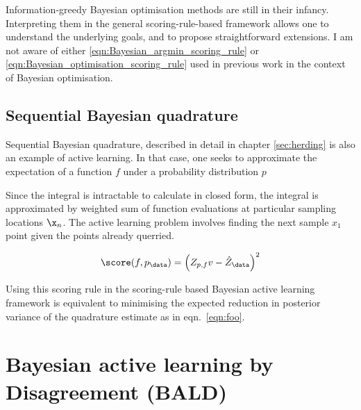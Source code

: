 Information-greedy Bayesian optimisation methods are still in their infancy. Interpreting them in the general scoring-rule-based framework allows one to understand the underlying goals, and to propose straightforward extensions. I am not aware of either \eqref{eqn:Bayesian_argmin_scoring_rule} or \eqref{eqn:Bayesian_optimisation_scoring_rule} used in previous work in the context of Bayesian optimisation.

\subsection{Sequential Bayesian quadrature}

Sequential Bayesian quadrature, described in detail in chapter \ref{sec:herding} is also an example of active learning. In that case, one seeks to approximate the expectation of a function $f$ under a probability distribution $p$

Since the integral is intractable to calculate in closed form, the integral is approximated by weighted sum of function evaluations at particular sampling locations $\x_n$. The active learning problem involves finding the next sample $x_1$ point given the points already querried.

\begin{equation}
	\score(f,p_\data) = \left(Z_{p,f}v - \hat{Z}_\data \right)^2
\end{equation}

Using this scoring rule in the scoring-rule based Bayesian active learning framework is equivalent to minimising the expected reduction in posterior variance of the quadrature estimate as in eqn.\ \eqref{eqn:foo}.

\section{Bayesian active learning by Disagreement (BALD)}
